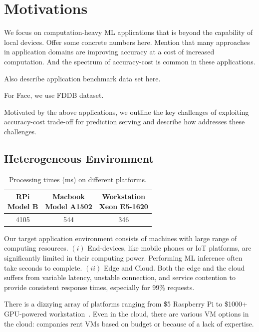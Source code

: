 \section{Motivations}
\label{sec:motivation}

We focus on computation-heavy ML applications that is beyond the capability of
local devices. Offer some concrete numbers here. Mention that many approaches in
application domains are improving accuracy at a cost of increased
computation. And the spectrum of accuracy-cost is common in these applications.

Also describe application benchmark data set here.

For Face, we use FDDB dataset.

Motivated by the above applications, we outline the key challenges of exploiting
accuracy-cost trade-off for prediction serving and describe how \sysname{}
addresses these challenges.

\subsection{Heterogeneous Environment}

\begin{table}
  \centering
  \begin{tabular}{c c c}
    \toprule
    \specialcell{RPi\\Model B}
    & \specialcell{Macbook \\ Model A1502}
    & \specialcell{Workstation\\Xeon E5-1620} \\
    \midrule
    4105 & 544 & 346 \\
    \bottomrule
  \end{tabular}
  \caption{Processing times (ms) on different platforms.}
\end{table}

Our target application environment consists of machines with large range of
computing resources. $(i)$ End-devices, like mobile phones or IoT platforms, are
significantly limited in their computing power. Performing ML inference often
take seconds to complete. $(ii)$ Edge and Cloud. Both the edge and the cloud
suffers from variable latency, unstable connection, and service contention to
provide consistent response times, especially for 99\% requests.

There is a dizzying array of platforms ranging from \$5 Raspberry Pi to \$1000+
GPU-powered workstation~\cite{zhang2015cloud}.  Even in the cloud, there are
various VM options in the cloud: companies rent VMs based on budget or because
of a lack of expertise.

